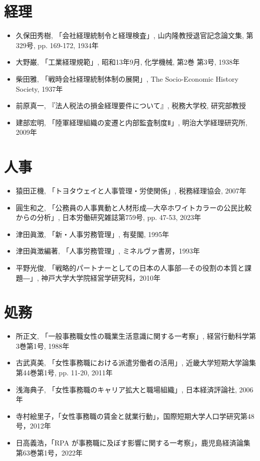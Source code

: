 \section*{経理}

\begin{itemize}
  \item 久保田秀樹, 「会社経理統制令と経理検査」, 山内隆教授退官記念論文集, 第329号, pp. 169-172, 1934年
  \item 大野巌, 「工業経理規範」, 昭和13年9月, 化学機械, 第2巻 第3号, 1938年
  \item 柴田雅, 「戦時会社経理統制体制の展開」, The Socio-Economic History Society, 1937年
  \item 前原真一, 『法人税法の損金経理要件について』, 税務大学校, 研究部教授
  \item 建部宏明, 「陸軍経理組織の変遷と内部監査制度Ⅱ」, 明治大学経理研究所, 2009年
\end{itemize}

\section*{人事}

\begin{itemize}
  \item 猿田正機, 「トヨタウェイと人事管理・労使関係」, 税務経理協会, 2007年
  \item 圓生和之, 「公務員の人事異動と人材形成―大卒ホワイトカラーの公民比較からの分析」, 日本労働研究雑誌第759号, pp. 47-53, 2023年
  \item 津田眞澂, 「新・人事労務管理」, 有斐閣, 1995年
  \item 津田眞澂編著, 「人事労務管理」, ミネルヴァ書房，1993年
  \item 平野光俊, 「戦略的パートナーとしての日本の人事部―その役割の本質と課題―」, 神戸大学大学院経営学研究科，2010年
\end{itemize}

\clearpage
\section*{処務}

\begin{itemize}
  \item 所正文, 「一般事務職女性の職業生活意識に関する一考察」, 経営行動科学第3巻第1号, 1988年
  \item 古武真美, 「女性事務職における派遣労働者の活用」, 近畿大学短期大学論集第44巻第1号, pp. 11-20, 2011年
  \item 浅海典子, 「女性事務職のキャリア拡大と職場組織」, 日本経済評論社, 2006年
  \item 寺村絵里子，「女性事務職の賃金と就業行動」，国際短期大学人口学研究第48号，2012年
  \item 日高義浩，「RPA が事務職に及ぼす影響に関する一考察」，鹿児島経済論集第63巻第1号，2022年
\end{itemize}
